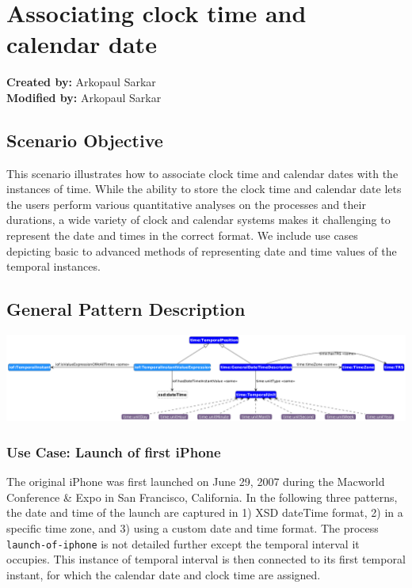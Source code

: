 \section{Associating clock time and calendar date}
\label{sec-change-location}

\textbf{Created by:} Arkopaul Sarkar \\
\textbf{Modified by:} Arkopaul Sarkar \\

\subsection*{Scenario Objective}

This scenario illustrates how to associate clock time and calendar dates with the instances of time. While the ability to store the clock time and calendar date lets the users perform various quantitative analyses on the processes and their durations, a wide variety of clock and calendar systems makes it challenging to represent the date and times in the correct format. We include use cases depicting basic to advanced methods of representing date and time values of the temporal instances.


\subsection*{General Pattern Description}

\includegraphics[scale=0.28]{scenarios/clock-time-calendar-date/images/general-clock-calendar.png}

\subsubsection*{Use Case: Launch of first iPhone} 
The original iPhone was first launched on June 29, 2007 during the Macworld Conference \& Expo in San Francisco, California. In the following three patterns, the date and time of the launch are captured in 1) XSD dateTime format, 2) in a specific time zone, and 3) using a custom date and time format. The process \texttt{launch-of-iphone} is not detailed further except the temporal interval it occupies. This instance of temporal interval is then connected to its first temporal instant, for which the calendar date and clock time are assigned.   

